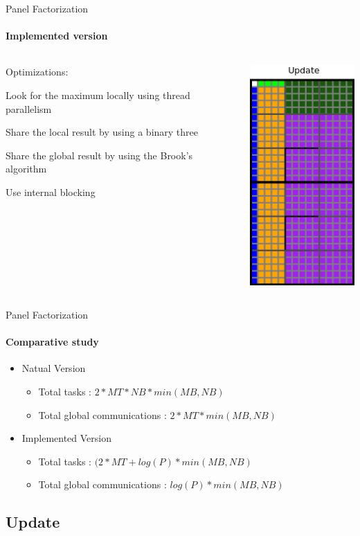 \documentclass{beamer}
\begin{document}
\begin{frame}{Panel Factorization}
\framesubtitle{Implemented version}
\begin{columns}
\begin{column}{.50\textwidth}
Optimizations:
\begin{itemize}
{
\item Look for the maximum locally using thread parallelism
\item Share the local result by using a binary three
\item Share the global result by using the Brook's algorithm}
\item Use internal blocking
\end{itemize}
\end{column}
\hfill
\begin{column}{.50\textwidth}
\begin{center}
\includegraphics[scale=0.5]{panel_opt2.png}
\end{center}
\end{column}
\end{columns}
\end{frame}

\begin{frame}{Panel Factorization}
\framesubtitle{Comparative study}
\begin{itemize}
\item Natual Version
\begin{exampleblock}{}
\begin{itemize}
\item Total tasks : $2 * MT * NB * min(MB,NB)$
\item Total global communications : $2 * MT * min(MB,NB)$
\end{itemize}
\end{exampleblock}{}
\item Implemented Version
\begin{exampleblock}{}
\begin{itemize}
\item Total tasks : $(2 * MT + log(P) * min(MB,NB)$
\item Total global communications : $log(P) * min(MB,NB)$
\end{itemize}
\end{exampleblock}{}
\end{itemize}
\end{frame}


\subsection{Update}

\begin{frame}{}
\end{frame}
\end{document}
